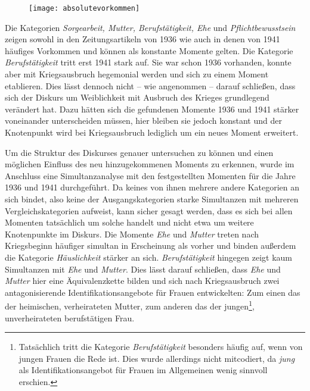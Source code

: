 \documentclass[12pt, titlepage=true, toc=bib]{scrartcl}
\begin{document}
\begin{figure}[htbp] %
\centering
\texttt{[image: absolutevorkommen]}%
\end{figure}
 
\noindent Die Kategorien \textit{Sorgearbeit, Mutter, Berufstätigkeit, Ehe} und \textit{Pflichtbewusstsein} zeigen sowohl in den Zeitungsartikeln von 1936 wie auch in denen von 1941 häufiges Vorkommen und können als konstante Momente gelten. Die Kategorie \textit{Berufstätigkeit} tritt erst 1941 stark auf. Sie war schon 1936 vorhanden, konnte aber mit Kriegsausbruch hegemonial werden und sich zu einem Moment etablieren. Dies lässt dennoch nicht -- wie angenommen -- darauf schließen, dass sich der Diskurs um Weiblichkeit mit Ausbruch des Krieges grundlegend verändert hat. Dazu hätten sich die gefundenen Momente 1936 und 1941 stärker voneinander unterscheiden müssen, hier bleiben sie jedoch konstant und der Knotenpunkt wird bei Kriegsausbruch lediglich um ein neues Moment erweitert.

Um die Struktur des Diskurses genauer untersuchen zu können und einen möglichen Einfluss des neu hinzugekommenen Moments zu erkennen, wurde im Anschluss eine Simultanzanalyse mit den festgestellten Momenten für die Jahre 1936 und 1941 durchgeführt. Da keines von ihnen mehrere andere Kategorien an sich bindet, also keine der Ausgangskategorien starke Simultanzen mit mehreren Vergleichskategorien aufweist, kann sicher gesagt werden, dass es sich bei allen Momenten tatsächlich um solche handelt und nicht etwa um weitere Knotenpunkte im Diskurs. Die Momente \textit{Ehe} und \textit{Mutter} treten nach Kriegsbeginn häufiger simultan in Erscheinung als vorher und binden außerdem die Kategorie \textit{Häuslichkeit} stärker an sich. \textit{Berufstätigkeit} hingegen zeigt kaum Simultanzen mit \textit{Ehe} und \textit{Mutter}. Dies lässt darauf schließen, dass \textit{Ehe} und \textit{Mutter} hier eine Äquivalenzkette bilden und sich nach Kriegsausbruch zwei antagonisierende Identifikationsangebote für Frauen entwickelten: Zum einen das der heimischen, verheirateten Mutter, zum anderen das der jungen\footnote{Tatsächlich tritt die Kategorie \textit{Berufstätigkeit} besonders häufig auf, wenn von jungen Frauen die Rede ist. Dies wurde allerdings nicht mitcodiert, da \textit{jung} als Identifikationsangebot für Frauen im Allgemeinen wenig sinnvoll erschien.}, unverheirateten berufstätigen Frau. 
\end{document}
